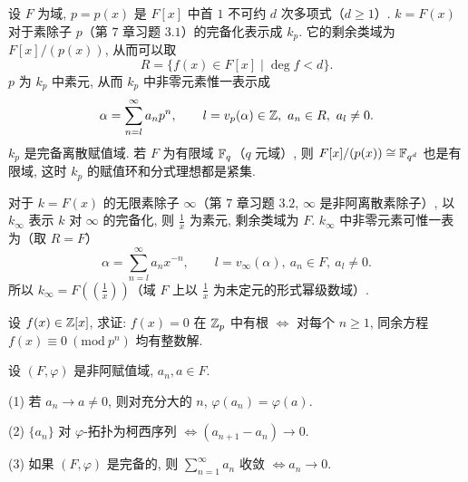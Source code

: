 \begin{example}
设 $F$ 为域, $p=p(x)$ 是 $F[x]$ 中首 $1$ 不可约 $d$ 次多项式（$d\geqslant 1$）. $k=F(x)$ 对于素除子 $p$（第 $7$ 章习题 $3.1$）的完备化表示成 $k_p$. 它的剩余类域为 $F[x]/(p(x))$, 从而可以取
\[
  R=\{f(x)\in F[x]\mid\deg f<d\}.
\]
$p$ 为 $k_p$ 中素元, 从而 $k_p$ 中非零元素惟一表示成
\[
  \alpha=\sum_{n=l}^{\infty}a_np^n,\qquad l=v_p(\alpha)\in\mathbb{Z},\ a_n\in R,\ a_l\neq 0.
\]
$k_p$ 是完备离散赋值域. 若 $F$ 为有限域 $\mathbb{F}_q$（$q$ 元域）, 则 $F[x]/(p(x))\cong\mathbb{F}_{q^d}$ 也是有限域, 这时 $k_p$ 的赋值环和分式理想都是紧集.

对于 $k=F(x)$ 的无限素除子 $\infty$（第 $7$ 章习题 $3.2$, $\infty$ 是非阿离散素除子）, 以 $k_{\infty}$ 表示 $k$ 对 $\infty$ 的完备化, 则 $\frac{1}{x}$ 为素元, 剩余类域为 $F$. $k_{\infty}$ 中非零元素可惟一表为（取 $R=F$）
\[
  \alpha=\sum_{n=l}^{\infty}a_nx^{-n},\qquad l=v_{\infty}(\alpha),\ a_n\in F,\ a_l\neq 0.
\]
所以 $k_{\infty}=F\left(\left(\frac{1}{x}\right)\right)$（域 $F$ 上以 $\frac{1}{x}$ 为未定元的形式幂级数域）.
\end{example}

\begin{Exercises}
\item 设 $f(x)\in\mathbb{Z}[x]$, 求证: $f(x)=0$ 在 $\mathbb{Z}_p$ 中有根 $\Leftrightarrow$ 对每个 $n\geqslant 1$, 同余方程 $f(x)\equiv 0\ (\mathrm{mod}\ p^n)$ 均有整数解.

\item 设 $(F,\varphi)$ 是非阿赋值域, $a_n,a\in F$.

(1) 若 $a_n\to a\neq 0$, 则对充分大的 $n$, $\varphi(a_n)=\varphi(a)$.

(2) $\{a_n\}$ 对 $\varphi$-拓扑为柯西序列 $\Leftrightarrow(a_{n+1}-a_n)\to 0$.

(3) 如果 $(F,\varphi)$ 是完备的, 则 $\sum_{n=1}^{\infty}a_n$ 收敛 $\Leftrightarrow a_n\to 0$.
\end{Exercises}
